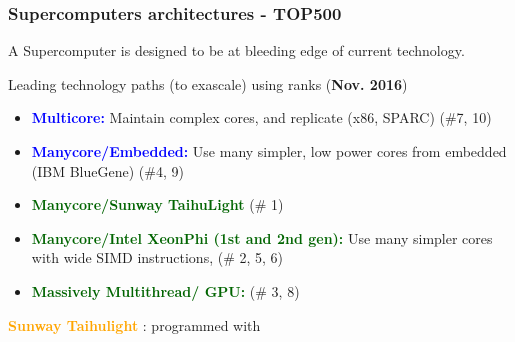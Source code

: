 \begin{frame}
  \frametitle{Supercomputers architectures - TOP500}

  A Supercomputer is designed to be at bleeding edge of current technology.

  { Leading technology paths (to exascale) using  ranks ({\bf Nov. 2016})}
  \begin{itemize}
  \item \textcolor{blue}{\textbf{Multicore:}} Maintain complex cores, and replicate (x86, SPARC) (\#7, 10)
  \item \textcolor{blue}{\textbf{Manycore/Embedded:}} Use many simpler, low power cores from embedded (IBM BlueGene) (\#4, 9)
  \item \textcolor{darkgreen}{\textbf{Manycore/Sunway TaihuLight}} (\# 1)
  \item \textcolor{darkgreen}{\textbf{Manycore/Intel XeonPhi (1st and 2nd gen):}} Use many simpler cores with wide SIMD instructions, (\# 2, 5, 6)
  \item \textcolor{darkgreen}{\textbf{Massively Multithread/ GPU:}}  (\# 3, 8)
  \end{itemize}

  \textcolor{orange}{\textbf{Sunway Taihulight}} : programmed with 


\end{frame}

